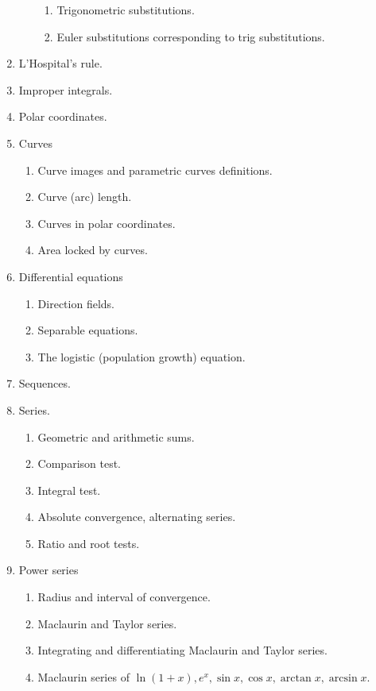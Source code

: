 \documentclass{article}
\begin{document}
\begin{enumerate}
\begin{enumerate}
\begin{enumerate}
\item Trigonometric substitutions.
\item Euler substitutions corresponding to trig substitutions.
\end{enumerate}
\end{enumerate}
\item L'Hospital's rule.
\item Improper integrals.
\item Polar coordinates.
\item Curves
\begin{enumerate}
\item Curve images and parametric curves definitions.
\item Curve (arc) length.
\item Curves in polar coordinates.
\item Area locked by curves.
\end{enumerate}
\item Differential equations
\begin{enumerate}
\item Direction fields.
\item Separable equations.
\item The logistic (population growth) equation.
\end{enumerate}
\item Sequences.
\item Series.
\begin{enumerate}
\item Geometric and arithmetic sums.
\item Comparison test.
\item Integral test.
\item Absolute convergence, alternating series.
\item Ratio and root tests.
\end{enumerate}
\item Power series
\begin{enumerate}
\item Radius and interval of convergence.
\item Maclaurin and Taylor series.
\item Integrating and differentiating Maclaurin and Taylor series. 
\item Maclaurin series of $\ln(1+x), e^x, \sin x, \cos x, \arctan x, \arcsin x$.
\end{enumerate}
\end{enumerate}
\end{document}
